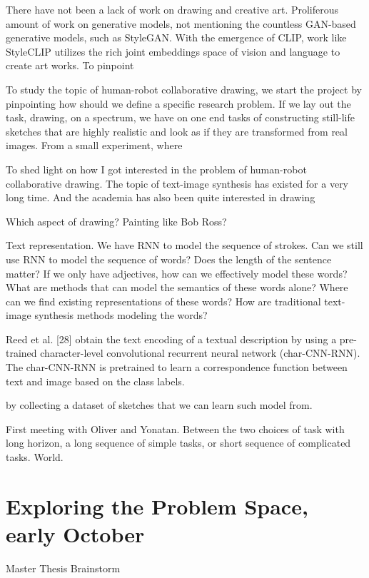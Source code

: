 There have not been a lack of work on drawing and creative art. Proliferous amount of work on generative models, not mentioning the countless GAN-based generative models, such as StyleGAN. With the emergence of CLIP, work like StyleCLIP utilizes the rich joint embeddings space of vision and language to create art works. To pinpoint 

To study the topic of human-robot collaborative drawing, we start the project by pinpointing how should we define a specific research problem. If we lay out the task, drawing, on a spectrum, we have on one end tasks of constructing still-life sketches that are highly realistic and look as if they are transformed from real images. From a small experiment, where  



To shed light on how I got interested in the problem of human-robot collaborative drawing. The topic of text-image synthesis has existed for a very long time. And the academia has also been quite interested in drawing 

Which aspect of drawing? Painting like Bob Ross? 

Text representation. 
We have RNN to model the sequence of strokes. Can we still use RNN to model the sequence of words? Does the length of the sentence matter? If we only have adjectives, how can we effectively model these words? What are methods that can model the semantics of these words alone? Where can we find existing representations of these words? How are traditional text-image synthesis methods modeling the words? 

Reed et al. [28] obtain the text encoding of a textual description by using a pre-trained character-level convolutional recurrent neural network (char-CNN-RNN). The char-CNN-RNN is pretrained to learn a correspondence function between text and image based on the class labels. 


by collecting a dataset of sketches that we can learn such model from. 

First meeting with Oliver and Yonatan. 
Between the two choices of task with long horizon, a long sequence of simple tasks, or short sequence of complicated tasks. 
World. 

\section{Exploring the Problem Space, early October} 

Master Thesis Brainstorm

